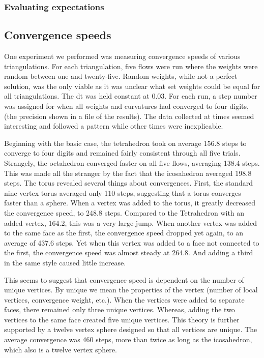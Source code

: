 \documentclass[12pt]{article}
\begin{document}
\subsubsection{Evaluating expectations}

\subsection{Convergence speeds}

One experiment we performed was measuring convergence speeds of various triangulations. For each triangulation, five flows were run where the weights were random between one and twenty-five. Random weights, while not a perfect solution, was the only viable as it was unclear what set weights could be equal for all triangulations. The dt was held constant at 0.03. For each run, a step number was assigned for when all weights and curvatures had converged to four digits, (the precision shown in a file of the results).  The data collected at times seemed interesting and followed a pattern while other times were inexplicable.\newline

\noindent Beginning with the basic case, the tetrahedron took on average 156.8 steps to converge to four digits and remained fairly consistent through all five trials. Strangely, the octahedron converged faster on all five flows, averaging 138.4 steps. This was made all the stranger by the fact that the icosahedron averaged 198.8 steps. The torus revealed several things about convergences. First, the standard nine vertex torus averaged only 110 steps, suggesting that a torus converges faster than a sphere. When a vertex was added to the torus, it greatly decreased the convergence speed, to 248.8 steps. Compared to the Tetrahedron with an added vertex, 164.2, this was a very large jump. When another vertex was added to the same face as the first, the convergence speed dropped yet again, to an average of 437.6 steps. Yet when this vertex was added to a face not connected to the first, the convergence speed was almost steady at 264.8. And adding a third in the same style caused little increase.\newline

\noindent This seems to suggest that convergence speed is dependent on the number of unique vertices. By unique we mean the properties of the vertex (number of local vertices, convergence weight, etc.). When the vertices were added to separate faces, there remained only three unique vertices. Whereas, adding the two vertices to the same face created five unique vertices. This theory is further supported by a twelve vertex sphere designed so that all vertices are unique. The average convergence was 460 steps, more than twice as long as the icosahedron, which also is a twelve vertex sphere.\newline
\end{document}

